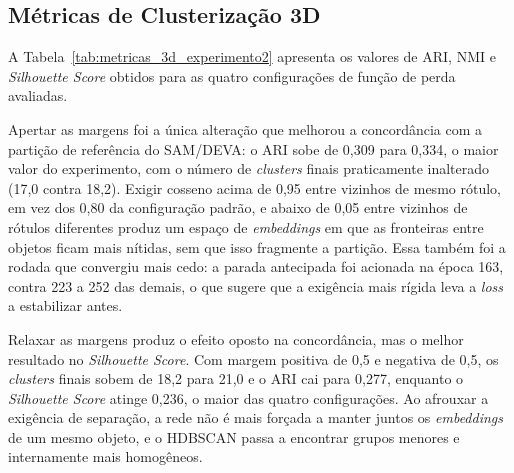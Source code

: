 \subsection{Métricas de Clusterização 3D}

A Tabela~\ref{tab:metricas_3d_experimento2} apresenta os valores de ARI, NMI e \textit{Silhouette Score} obtidos para as quatro configurações de função de perda avaliadas.

\begin{table}[h]
\centering
\caption{Métricas de clusterização 3D para cada configuração de perda (média de 5 execuções)}
\label{tab:metricas_3d_experimento2}
\end{table}

Apertar as margens foi a única alteração que melhorou a concordância com a partição de referência do SAM/DEVA: o ARI sobe de 0,309 para 0,334, o maior valor do experimento, com o número de \textit{clusters} finais praticamente inalterado (17,0 contra 18,2). Exigir cosseno acima de 0,95 entre vizinhos de mesmo rótulo, em vez dos 0,80 da configuração padrão, e abaixo de 0,05 entre vizinhos de rótulos diferentes produz um espaço de \textit{embeddings} em que as fronteiras entre objetos ficam mais nítidas, sem que isso fragmente a partição. Essa também foi a rodada que convergiu mais cedo: a parada antecipada foi acionada na época 163, contra 223 a 252 das demais, o que sugere que a exigência mais rígida leva a \textit{loss} a estabilizar antes.

Relaxar as margens produz o efeito oposto na concordância, mas o melhor resultado no \textit{Silhouette Score}. Com margem positiva de 0,5 e negativa de 0,5, os \textit{clusters} finais sobem de 18,2 para 21,0 e o ARI cai para 0,277, enquanto o \textit{Silhouette Score} atinge 0,236, o maior das quatro configurações. Ao afrouxar a exigência de separação, a rede não é mais forçada a manter juntos os \textit{embeddings} de um mesmo objeto, e o HDBSCAN passa a encontrar grupos menores e internamente mais homogêneos.

